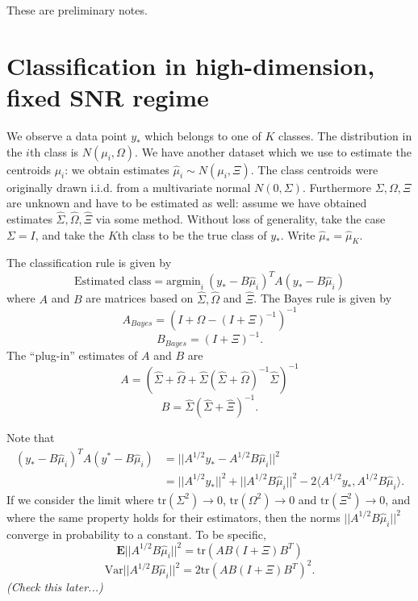 \documentclass[12pt]{article}
\begin{document}
\maketitle

\newcommand{\tr}{\text{tr}}
\newcommand{\E}{\textbf{E}}
\newcommand{\diag}{\text{diag}}
\newcommand{\argmax}{\text{argmax}}
\newcommand{\Cov}{\text{Cov}}
\newcommand{\Var}{\text{Var}}
\newcommand{\argmin}{\text{argmin}}
\newcommand{\Vol}{\text{Vol}}
\newcommand{\comm}[1]{}

These are preliminary notes.

\section{Classification in high-dimension, fixed SNR regime}

We observe a data point $y_*$ which belongs to one of $K$ classes.
The distribution in the $i$th class is $N(\mu_i, \Omega)$.  We have
another dataset which we use to estimate the centroids $\mu_i$: we
obtain estimates $\hat{\mu}_i \sim N(\mu_i, \Xi)$.  The class
centroids were originally drawn i.i.d. from a multivariate normal
$N(0, \Sigma)$.  Furthermore $\Sigma, \Omega, \Xi$ are unknown and
have to be estimated as well: assume we have obtained estimates
$\hat{\Sigma}, \hat{\Omega}, \hat{\Xi}$ via some method.  Without loss
of generality, take the case $\Sigma = I$, and take the $K$th class to
be the true class of $y_*$.  Write $\hat{\mu}_* = \hat{\mu}_K$.

The classification rule is given by
\[
\text{Estimated class} = \argmin_{i}\ (y_* - B\hat{\mu}_i)^T A (y_* - B\hat{\mu}_i)
\]
where $A$ and $B$ are matrices based on $\hat{\Sigma}, \hat{\Omega}$
and $\hat{\Xi}$.
The Bayes rule is given by
\[
A_{Bayes} = (I + \Omega - (I + \Xi)^{-1})^{-1}
\]
\[
B_{Bayes} = (I + \Xi)^{-1}.
\]
The ``plug-in'' estimates of $A$ and $B$ are
\[
A = (\hat{\Sigma} + \hat{\Omega} + 
\hat{\Sigma}(\hat{\Sigma} + \hat{\Omega})^{-1}\hat{\Sigma})^{-1}
\]
\[
B = \hat{\Sigma}(\hat{\Sigma} + \hat{\Xi})^{-1}.
\]

Note that
\begin{align*}
(y_* - B\hat{\mu}_i)^T A (y^* - B\hat{\mu}_i) &=
||A^{1/2} y_* - A^{1/2} B\hat{\mu}_i||^2
\\&= ||A^{1/2}y_*||^2 + ||A^{1/2} B\hat{\mu}_i||^2 -
2 \langle A^{1/2}y_*, A^{1/2}B\hat{\mu}_i \rangle.
\end{align*}
If we consider the limit where $\tr (\Sigma^2) \to 0$, $\tr
(\Omega^2) \to 0$ and $\tr (\Xi^2) \to 0$, and where the same property
holds for their estimators, then the norms $||A^{1/2}
B\hat{\mu}_i||^2$ converge in probability to a constant.
To be specific,
\[
\E||A^{1/2} B\hat{\mu}_i||^2 = \tr(AB(I + \Xi)B^T)
\]
\[
\Var||A^{1/2} B\hat{\mu}_i||^2 = 2\tr(AB(I + \Xi)B^T)^2.
\]
\emph{(Check this later...)}
\end{document}

